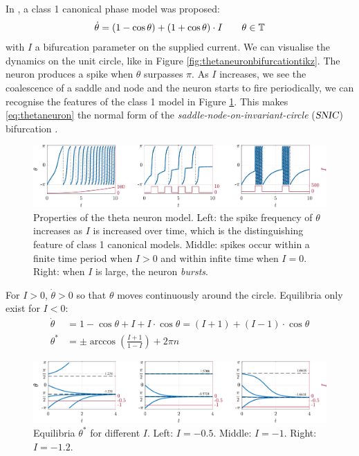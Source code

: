In \cite{Ermentrout1986}, a class 1 canonical phase model was proposed:
\begin{align}
\dot{\theta} = (1-\cos \theta)+(1+\cos \theta) \cdot I \qquad \theta \in {\mathbb{T}} \label{eq:thetaneuron}
\end{align}
with $I$ a bifurcation parameter on the supplied current. We can visualise the dynamics on the unit circle, like in Figure \ref{fig:thetaneuronbifurcationtikz}. The neuron produces a spike when $\theta$ surpasses $\pi$. As $I$ increases, we see the coalescence of a saddle and node and the neuron starts to fire periodically, we can recognise the features of the class 1 model in Figure \ref{fig:ThetaNeuronResponseToCurrent}. This makes \eqref{eq:thetaneuron} the normal form of the \textit{saddle-node-on-invariant-circle} (${\textsl{SNIC}}$) bifurcation \cite{Luke2013}.

\begin{figure}[H]
\centering
\includegraphics[width = \textwidth]{../Figures/ThetaNeuronResponseToCurrent.pdf}
\caption{Properties of the theta neuron model. Left: the spike frequency of $\theta$ increases as $I$ is increased over time, which is the distinguishing feature of class 1 canonical models. Middle: spikes occur within a finite time period when $I > 0$ and within infite time when $I = 0$. Right: when $I$ is large, the neuron \textsl{bursts}.}
\label{fig:ThetaNeuronResponseToCurrent}
\end{figure}

For $I > 0$, $\dot{\theta} > 0$ so that $\theta$ moves continuously around the circle. Equilibria only exist for $I < 0$: 
\begin{align*}
\dot{\theta} &= 1-\cos \theta+I+I \cdot \cos \theta = (I+1)+(I-1) \cdot \cos \theta \\
\theta^{\ast} &= \pm \arccos \left(\frac{I+1}{1-I}\right)+2 \pi n
\end{align*}

\begin{figure}[H]
\centering
\includegraphics[width = \textwidth]{../Figures/ThetaModelEquilibriumPoints.pdf}
\caption{Equilibria $\theta^{\ast}$ for different $I$. Left: $I = -0.5$. Middle: $I = -1$. Right: $I = -1.2$.}
\label{fig:ThetaModelEquilibriumPoints}
\end{figure}





